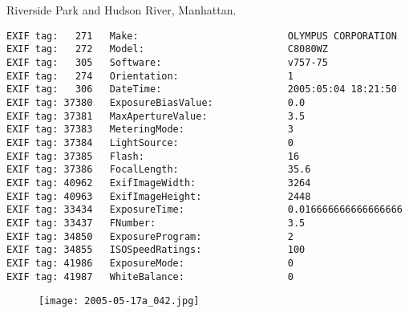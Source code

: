 \section{\protect{}}
\noindent Riverside Park and Hudson River, Manhattan.
\noindent
\begin{lstlisting}
EXIF tag:   271   Make:                          OLYMPUS CORPORATION
EXIF tag:   272   Model:                         C8080WZ
EXIF tag:   305   Software:                      v757-75
EXIF tag:   274   Orientation:                   1
EXIF tag:   306   DateTime:                      2005:05:04 18:21:50
EXIF tag: 37380   ExposureBiasValue:             0.0
EXIF tag: 37381   MaxApertureValue:              3.5
EXIF tag: 37383   MeteringMode:                  3
EXIF tag: 37384   LightSource:                   0
EXIF tag: 37385   Flash:                         16
EXIF tag: 37386   FocalLength:                   35.6
EXIF tag: 40962   ExifImageWidth:                3264
EXIF tag: 40963   ExifImageHeight:               2448
EXIF tag: 33434   ExposureTime:                  0.016666666666666666
EXIF tag: 33437   FNumber:                       3.5
EXIF tag: 34850   ExposureProgram:               2
EXIF tag: 34855   ISOSpeedRatings:               100
EXIF tag: 41986   ExposureMode:                  0
EXIF tag: 41987   WhiteBalance:                  0

\end{lstlisting}
\clearpage
\begin{figure}
\raggedleft
\texttt{[image: 2005-05-17a\_042.jpg]}
\end{figure}


\clearpage
